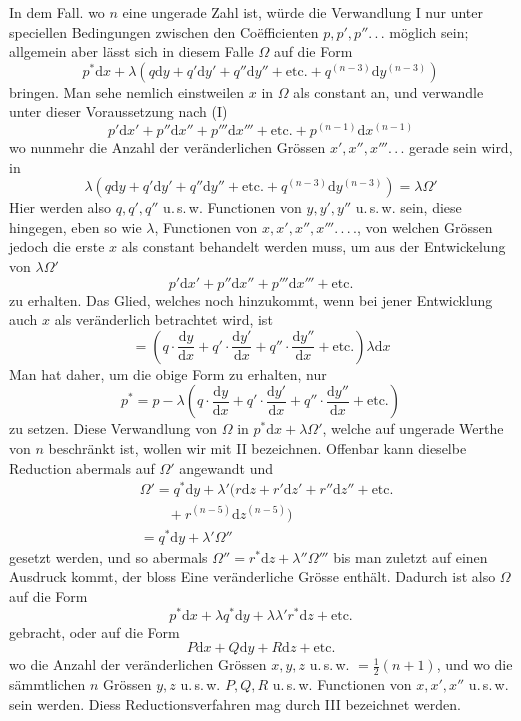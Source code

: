 \par
In dem Fall. wo $n$ eine ungerade Zahl ist, würde die Verwandlung I nur
unter speciellen Bedingungen zwischen den Coëfficienten $p,p',p''.\,.\,.$ möglich
sein; allgemein aber lässt sich in diesem Falle $\Omega$ auf die Form
\[
p^{*}\mathrm{d}x+\lambda(q\mathrm{d}y+q'\mathrm{d}y'+q''\mathrm{d}y''+\mathrm{etc.}
+q^{(n-3)}\mathrm{d}y^{(n-3)})
\]
bringen. Man sehe nemlich einstweilen $x$ in $\Omega$ als constant an, und verwandle
unter dieser Voraussetzung nach (I)
\[
p'\mathrm{d}x'+p''\mathrm{d}x''+p'''\mathrm{d}x'''+\mathrm{etc.}
+p^{(n-1)}\mathrm{d}x^{(n-1)}
\]
wo nunmehr die Anzahl der veränderlichen Grössen $x',x'',x'''.\,.\,.$ gerade sein
wird, in
\[
\lambda(q\mathrm{d}y+q'\mathrm{d}y'+q''\mathrm{d}y''+\mathrm{etc.}
+q^{(n-3)}\mathrm{d}y^{(n-3)})=\lambda\Omega'
\]
Hier werden also $q,q',q''$ u.\,s.\,w. Functionen von $y,y',y''$ u.\,s.\,w. sein, diese hingegen, eben so wie $\lambda$, Functionen von $x,x',x'',x'''.\,.\,.\,.$, von welchen Grössen
jedoch die erste $x$ als constant behandelt werden muss, um aus der Entwickelung von $\lambda\Omega'$
\[
p'\mathrm{d}x'+p''\mathrm{d}x''+p'''\mathrm{d}x'''+\mathrm{etc.}
\]
zu erhalten. Das Glied, welches noch hinzukommt, wenn bei jener Entwicklung
auch $x$ als veränderlich betrachtet wird, ist
\[
=(q\cdot\frac{\mathrm{d}y}{\mathrm{d}x}
+q'\cdot\frac{\mathrm{d}y'}{\mathrm{d}x}
+q''\cdot\frac{\mathrm{d}y''}{\mathrm{d}x}+\mathrm{etc.})\lambda\mathrm{d}x
\]
Man hat daher, um die obige Form zu erhalten, nur
\[
p^{*}=p-\lambda(q\cdot\frac{\mathrm{d}y}{\mathrm{d}x}
+q'\cdot\frac{\mathrm{d}y'}{\mathrm{d}x}
+q''\cdot\frac{\mathrm{d}y''}{\mathrm{d}x}+\mathrm{etc.})
\]
zu setzen. Diese Verwandlung von $\Omega$ in $p^{*}\mathrm{d}x+\lambda\Omega'$, welche auf ungerade Werthe von $n$ beschränkt ist, wollen wir mit II bezeichnen. Offenbar kann dieselbe
Reduction abermals auf $\Omega'$ angewandt und
\[
\begin{aligned}
&\Omega'=q^{*}\mathrm{d}y+\lambda'(r\mathrm{d}z+r'\mathrm{d}z'+r''\mathrm{d}z''+\mathrm{etc.}\\&\qquad+r^{(n-5)}\mathrm{d}z^{(n-5)})\\
&=q^{*}\mathrm{d}y+\lambda'\Omega''
\end{aligned}
\]
gesetzt werden, und so abermals $\Omega''=r^{*}\mathrm{d}z+\lambda''\Omega'''$ bis man zuletzt auf einen
Ausdruck kommt, der bloss Eine veränderliche Grösse enthält. Dadurch ist also
$\Omega$ auf die Form
\[
p^{*}\mathrm{d}x+\lambda q^{*}\mathrm{d}y+\lambda\lambda'r^{*}\mathrm{d}z+\mathrm{etc.}
\]
gebracht, oder auf die Form
\[
P\mathrm{d}x+Q\mathrm{d}y+R\mathrm{d}z+\mathrm{etc.}
\]
wo die Anzahl der veränderlichen Grössen $x,y,z$ u.\,s.\,w. $=\frac12(n+1)$, und wo die
sämmtlichen $n$ Grössen $y,z$ u.\,s.\,w. $P,Q,R$ u.\,s.\,w. Functionen von $x,x',x''$ u.\,s.\,w.
sein werden. Diess Reductionsverfahren mag durch III bezeichnet werden.

